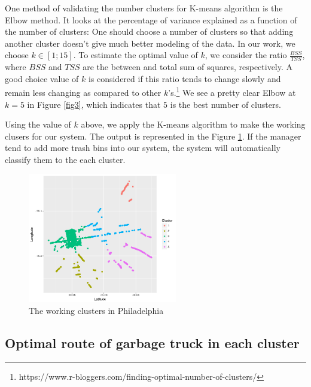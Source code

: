 \documentclass[conference]{IEEEtran}
\begin{document}
One method of validating the number clusters for K-means algorithm is the Elbow method. It looks at the percentage of variance explained as a function of the number of clusters: One should choose a number of clusters so that adding another cluster doesn’t give much better modeling of the data. In our work, we choose $k \in [1;15]$. To estimate the optimal value of $k$, we consider the ratio $\frac{BSS}{TSS}$, where $BSS$ and $TSS$ are the between and total sum of squares, respectively. A good choice value of $k$ is considered if this ratio tends to change slowly and remain less changing as compared to other $k$'s.\footnote{https://www.r-bloggers.com/finding-optimal-number-of-clusters/} We see a pretty clear Elbow at $k = 5$ in Figure \ref{fig3}, which indicates that $5$ is the best number of clusters.


\par Using the value of $k$ above, we apply the K-means algorithm to make the working clusers for our system. The output is represented in the Figure \ref{fig4}. If the manager tend to add more trash bins into our system, the system will automatically classify them to the each cluster. 

\begin{figure}
	\centering
	\includegraphics[width=6.5cm]{workingcluster}
	\caption{The working clusters in Philadelphia}
	\label{fig4}
\end{figure}

\subsection{Optimal route of garbage truck in each cluster}
\end{document}
